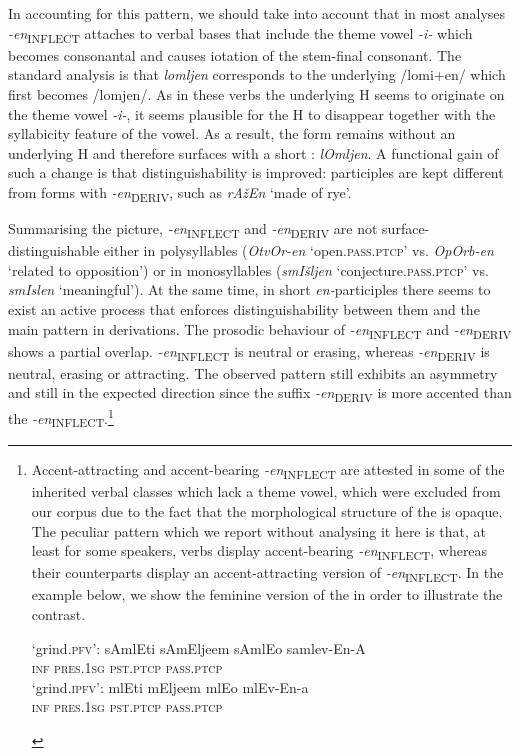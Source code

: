 \documentclass[output=paper, colorlinks, citecolor=brown, newtxmath]{langsci/langscibook}
\begin{document}
In accounting for this pattern, we should take into account that in most analyses \textit{-en}\textsubscript{INFLECT} attaches to verbal bases that include the theme vowel \textit{-i-} which becomes consonantal and causes iotation of the stem-final consonant. The standard analysis is that \textit{lomljen} corresponds to the underlying /lomi+en/ which first becomes /lomjen/. As in these verbs the underlying H seems to originate on the theme vowel \textit{-i-}, it seems plausible for the H to disappear together with the syllabicity feature of the vowel. As a result, the form remains without an underlying H and therefore surfaces with a short : \textit{lOmljen}. A functional gain of such a change is that distinguishability is improved: participles are kept different from  forms with \textit{{-en}}\textsubscript{DERIV}, such as \textit{rAžEn} `made of rye'.


\largerpage
\sloppy
Summarising the picture, \textit{{-en}}\textsubscript{INFLECT}  and \textit{{-en}}\textsubscript{DERIV}  are not surface-distin\-guish\-able either in polysyllables (\textit{OtvOr-en} `open.\textsc{pass.ptcp}' vs. \textit{OpOrb-en}  `related to opposition') or in monosyllables (\textit{smIšljen} `conjecture.\textsc{pass.ptcp}' vs. \textit{smIslen} `meaningful'). At the same time, in short \textit{en-}participles there seems to exist an active process that enforces distinguishability between them and the main pattern in  derivations.
The prosodic behaviour of \textit{-en}\textsubscript{INFLECT} and \textit{-en}\textsubscript{DERIV} shows a partial overlap. \textit{-en}\textsubscript{INFLECT} is neutral or erasing, whereas \textit{-en}\textsubscript{DERIV} is neutral, erasing or attracting. The observed pattern still exhibits an asymmetry and still in the expected direction since  the  suffix \textit{-en}\textsubscript{DERIV} is more accented than the  \textit{-en}\textsubscript{INFLECT}.\footnote{Accent-attracting and accent-bearing \textit{-en}\textsubscript{INFLECT} are attested in some of the inherited verbal classes which lack a theme vowel, which were excluded from our corpus due to the fact that the morphological structure of the  is opaque. The peculiar pattern which we report without analysing it here is that, at least for some speakers,  verbs display accent-bearing \textit{-en}\textsubscript{INFLECT}, whereas their  counterparts display an accent-attracting version of {\textit{-en}}\textsubscript{INFLECT}. In the example below, we show the feminine version of the  in order to illustrate the contrast.
\fussy
\ea
		\begin{xlist} \ex `grind.\textsc{pfv}': \gll
		sAmlEti	sAmEljeem	sAmlEo samlev-En-A \\
        \textsc{inf} \textsc{pres.1sg} \textsc{pst.ptcp} \textsc{pass.ptcp}
\\
\ex `grind.\textsc{ipfv}': \gll  mlEti	mEljeem	mlEo mlEv-En-a
\\ \textsc{inf} \textsc{pres.1sg} \textsc{pst.ptcp} \textsc{pass.ptcp} \\
		\glt
	\end{xlist}
	\zlast}
\end{document}
